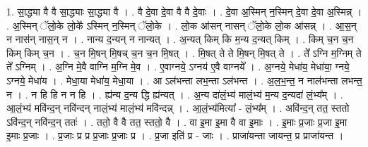 \documentclass[17pt]{extarticle}
\begin{document}
1. सा॒द्ध्या वै वै सा॒द्ध्याः सा॒द्ध्या वै । . वै दे॒वा दे॒वा वै वै दे॒वाः । . दे॒वा अ॒स्मिन् न॒स्मिन् दे॒वा दे॒वा अ॒स्मिन्न् । . अ॒स्मिन् ॅलो॒के लो॒के᳚ ऽस्मिन् न॒स्मिन् ॅलो॒के । . लो॒क आ॑सन् नासन् ॅलो॒के लो॒क आ॑सन्न् । . आ॒स॒न् न नास॑न् नास॒न् न । . नान्य द॒न्यन् न नान्यत् । . अ॒न्यत् किम् कि म॒न्य द॒न्यत् किम् । . किम् च॒न च॒न किम् किम् च॒न । . च॒न मि॒षन् मि॒षच् च॒न च॒न मि॒षत् । . मि॒षत् ते ते मि॒षन् मि॒षत् ते । . ते᳚ ऽग्नि म॒ग्निम् ते ते᳚ ऽग्निम् । . अ॒ग्नि मे॒वै वाग्नि म॒ग्नि मे॒व । . ए॒वाग्नये॒ ऽग्नय॑ ए॒वै वाग्नये᳚ । . अ॒ग्नये॒ मेधा॑य॒ मेधा॑या॒ ग्नये॒ ऽग्नये॒ मेधा॑य । . मेधा॒या मेधा॑य॒ मेधा॒या । . आ ऽल॑भन्ता लभ॒न्ता ऽल॑भन्त । . अ॒ल॒भ॒न्त॒ न नाल॑भन्ता लभन्त॒ न । . न हि हि न न हि । . ह्य॑न्य द॒न्य द्धि ह्य॑न्यत् । . अ॒न्य दा॑लं॒भ्य॑ मालं॒भ्य॑ म॒न्य द॒न्यदा॑ लं॒भ्य᳚म् । . आ॒लं॒भ्य॑ मवि॑न्द॒न् नवि॑न्दन् नालं॒भ्य॑ मालं॒भ्य॑ मवि॑न्दन्न् । . आ॒लं॒भ्य॑मित्या᳚ - लं॒भ्य᳚म् । . अवि॑न्द॒न् तत॒ स्ततो ऽवि॑न्द॒न् नवि॑न्द॒न् ततः॑ । . ततो॒ वै वै तत॒ स्ततो॒ वै । . वा इ॒मा इ॒मा वै वा इ॒माः । . इ॒माः प्र॒जाः प्र॒जा इ॒मा इ॒माः प्र॒जाः । . प्र॒जाः प्र प्र प्र॒जाः प्र॒जाः प्र । . प्र॒जा इति॑ प्र - जाः । . प्राजा॑यन्ता जायन्त॒ प्र प्राजा॑यन्त । \newline
\end{document}
